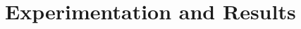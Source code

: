 \documentclass[english]{tktltiki2}
\theoremstyle{definition}
\theoremstyle{remark}
\begin{document}



\section{Experimentation and Results} %
\end{document}
